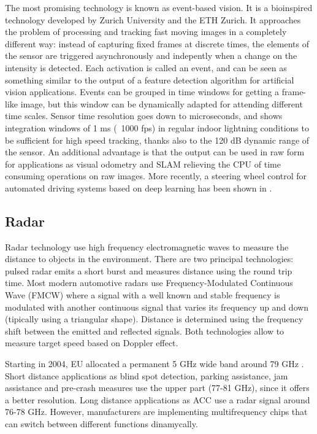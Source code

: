 The most promising technology is known as event-based vision. It is a 
bioinspired technology developed by Zurich University and the ETH Zurich. 
It approaches the problem of processing and tracking fast 
moving images in a completely different way: instead of capturing fixed frames
at discrete times, the elements of the sensor are triggered asynchronously and
indepently when a change on the intensity is detected. Each activation is
called an event, and can be seen as something similar to the output of a 
feature detection algorithm for artificial vision applications.
Events can be grouped in time windows for getting a frame-like image, but this
window can be dynamically adapted for attending different time scales.
Sensor time resolution goes down to microseconds, and \cite{Mueggler2014} shows 
integration windows of 1 ms (~1000 fps) in regular indoor lightning conditions
to be sufficient for high speed tracking, thanks also to the 120 dB dynamic 
range of the sensor.
An additional advantage is that the output can be used in raw form for 
applications as visual odometry \cite{Censi2014} and SLAM \cite{Vidal2017}
relieving the CPU of time consuming operations on raw images.
More recently, a steering wheel control for automated driving systems 
based on deep learning has been shown in \cite{Maqueda2018}.
 
 

\subsection{Radar}

Radar technology use high frequency electromagnetic waves to measure the
distance to objects in the environment.
There are two principal technologies: pulsed radar emits a short burst and 
measures distance using the round trip time. Most modern automotive 
radars use Frequency-Modulated Continuous Wave (FMCW) where a signal with
a well known and stable frequency is modulated with another continuous signal
that varies its frequency up and down (tipically using a triangular shape).
Distance is determined using the frequency shift between the emitted and 
reflected signals. Both technologies allow to measure target speed based
on Doppler effect.

Starting in 2004, EU allocated a permanent 5 GHz wide band around 79 GHz 
\cite{EULawandPublications2004}. 
Short distance applications as blind spot detection, parking assistance, jam 
assistance and pre-crash measures use the upper part (77-81 GHz), since it 
offers a better resolution. Long distance applications as ACC use a radar 
signal around 76-78 GHz. However, manufacturers are implementing multifrequency 
chips that can switch between different functions dinamycally.

